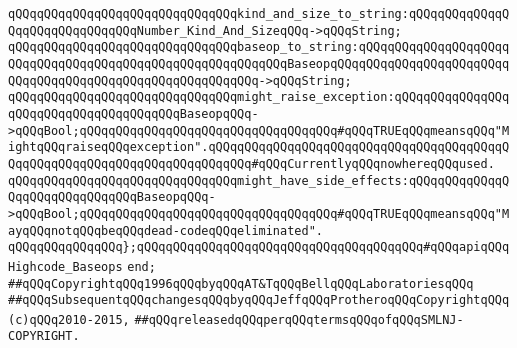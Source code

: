 \newline
\verb|qQQqqQQqqQQqqQQqqQQqqQQqqQQqqQQqkind_and_size_to_string:qQQqqQQqqQQqqQQqqQQqqQQqqQQqqQQqNumber_Kind_And_SizeqQQq->qQQqString;|\newline
\verb|qQQqqQQqqQQqqQQqqQQqqQQqqQQqqQQqbaseop_to_string:qQQqqQQqqQQqqQQqqQQqqQQqqQQqqQQqqQQqqQQqqQQqqQQqqQQqqQQqqQQqBaseopqQQqqQQqqQQqqQQqqQQqqQQqqQQqqQQqqQQqqQQqqQQqqQQqqQQqqQQqqQQq->qQQqString;|\newline
\newline
\verb|qQQqqQQqqQQqqQQqqQQqqQQqqQQqqQQqmight_raise_exception:qQQqqQQqqQQqqQQqqQQqqQQqqQQqqQQqqQQqqQQqBaseopqQQq->qQQqBool;qQQqqQQqqQQqqQQqqQQqqQQqqQQqqQQqqQQq#qQQqTRUEqQQqmeansqQQq"MightqQQqraiseqQQqexception".qQQqqQQqqQQqqQQqqQQqqQQqqQQqqQQqqQQqqQQqqQQqqQQqqQQqqQQqqQQqqQQqqQQqqQQqqQQq#qQQqCurrentlyqQQqnowhereqQQqused.|\newline
\verb|qQQqqQQqqQQqqQQqqQQqqQQqqQQqqQQqmight_have_side_effects:qQQqqQQqqQQqqQQqqQQqqQQqqQQqqQQqBaseopqQQq->qQQqBool;qQQqqQQqqQQqqQQqqQQqqQQqqQQqqQQqqQQq#qQQqTRUEqQQqmeansqQQq"MayqQQqnotqQQqbeqQQqdead-codeqQQqeliminated".|\newline
\newline
\verb|qQQqqQQqqQQqqQQq};qQQqqQQqqQQqqQQqqQQqqQQqqQQqqQQqqQQqqQQq#qQQqapiqQQqHighcode_Baseops|\newline
\verb|end;|\newline
\newline
\newline
\verb|##qQQqCopyrightqQQq1996qQQqbyqQQqAT&TqQQqBellqQQqLaboratoriesqQQq|\newline
\verb|##qQQqSubsequentqQQqchangesqQQqbyqQQqJeffqQQqProtheroqQQqCopyrightqQQq(c)qQQq2010-2015,|\newline
\verb|##qQQqreleasedqQQqperqQQqtermsqQQqofqQQqSMLNJ-COPYRIGHT.|\newline


